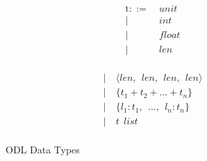 \begin{figure}[h]
\begin{minipage}{0.4\columnwidth}
\begin{align*}
\text{t}::=~&unit\\
|~&int\\
|~&float\\
|~&len\\
\end{align*}
\end{minipage}
\begin{minipage}{0.4\columnwidth}
\begin{align*}
|~&\langle len, ~~ len, ~~ len, ~~ len\rangle\\
|~&\{t_1 + t_2 + ... + t_n\}\\
|~&\{l_1 : t_1, ~~ ..., ~~ l_n : t_n\}\\
|~&t ~~ list\\
\end{align*}
\end{minipage}
\caption{ODL Data Types}\label{fig:type}
\end{figure}

